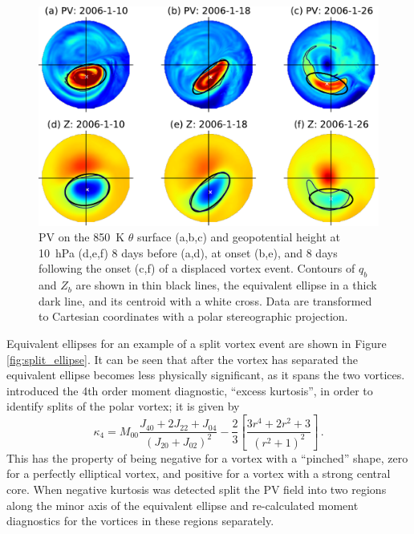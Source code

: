 \begin{figure}
 \centering
 \noindent\includegraphics[width=\textwidth]{figures/chapter-moments/PV_GPH_2006.pdf}
 \caption[Equivalent ellipse for a displaced vortex event.]{PV on the 850~K
   $\theta$ surface (a,b,c) and geopotential height at 10~hPa (d,e,f) 8 days
   before (a,d), at onset (b,e), and 8 days following the onset (c,f) of a
   displaced vortex event. Contours of $q_{b}$ and $Z_{b}$ are shown in thin
   black lines, the equivalent ellipse in a thick dark line, and its centroid
   with a white cross. Data are transformed to Cartesian coordinates with a
   polar stereographic projection.}
 \label{fig:displaced_ellipse}
\end{figure}

Equivalent ellipses for an example of a split vortex event are shown in Figure
\ref{fig:split_ellipse}. It can be seen that after the vortex has separated the
equivalent ellipse becomes less physically significant, as it spans the two
vortices. \citet{Matthewman2009} introduced the 4th order moment diagnostic,
``excess kurtosis'', in order to identify splits of the polar vortex; it is
given by
\begin{equation}
\kappa_4 = M_{00}\frac{J_{40}+2J_{22}+J_{04}}{(J_{20}+J_{02})^2}-\frac{2}{3}\left[\frac{3r^4+2r^2+3}{(r^2+1)^2}\right]\,.
\end{equation}
This has the property of being negative for a vortex with a ``pinched'' shape,
zero for a perfectly elliptical vortex, and positive for a vortex with a strong
central core. When negative kurtosis was detected \citet{Matthewman2009} split
the PV field into two regions along the minor axis of the equivalent ellipse and
re-calculated moment diagnostics for the vortices in these regions separately.


